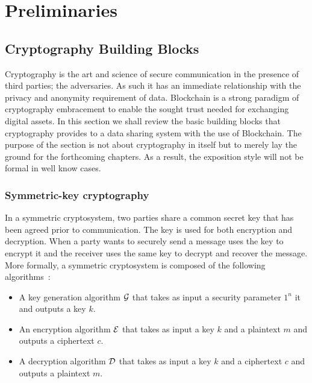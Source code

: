 \chapter{Preliminaries}
\label{preliminaries}

\section{Cryptography Building Blocks}
\label{preliminaries:crypto_block}

Cryptography is the art and science of secure communication in the presence of third parties; the adversaries. As such it has an immediate relationship with the privacy and anonymity requirement of data. Blockchain is a strong paradigm of cryptography embracement to enable the sought trust needed for exchanging digital assets. In this section we shall review the basic building blocks that cryptography provides to a data sharing system with the use of Blockchain. The purpose of the section is not about cryptography in itself but to merely lay the ground for the forthcoming chapters. As a result, the exposition style will not be formal in well know cases.

\subsection{Symmetric-key cryptography}
\label{preliminaries:crypto_block:sym}

In a symmetric cryptosystem, two parties share a common secret key that has been agreed prior to communication. The key is used for both encryption and decryption. When a party wants to securely send a message uses the key to encrypt it and the receiver uses the same key to decrypt and recover the message. More formally, a symmetric cryptosystem is composed of the following algorithms~\cite{Katz:2014:IMC:2700550, kiagias:crypto}:

\begin{itemize}
  \item A key generation algorithm $\mathcal{G}$ that takes as input a security parameter $1^{n}$ it and outputs a key $k$.
  \item An encryption algorithm $\mathcal{E}$ that takes as input a key $k$ and a plaintext $m$ and outputs a ciphertext $c$.
  \item A decryption algorithm $\mathcal{D}$ that takes as input a key $k$ and a ciphertext $c$ and outputs a plaintext $m$.
\end{itemize}

